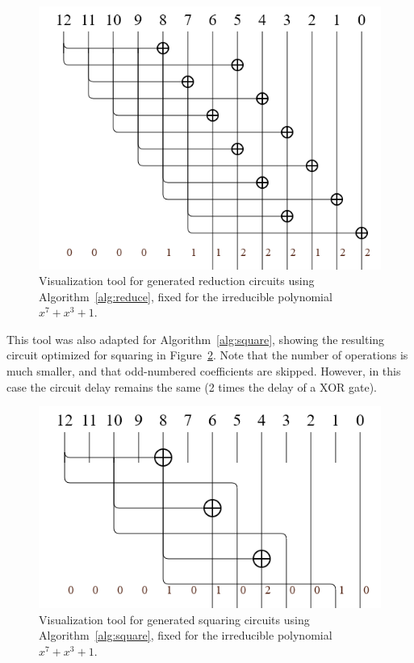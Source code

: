 \begin{figure}
  \caption{Visualization tool for generated reduction circuits using Algorithm~\ref{alg:reduce}, fixed for the irreducible polynomial $x^7 + x^3 + 1$.}
  \label{fig:circuit_reducing_7_3_0}
  \centering
  \includegraphics[width = .8\columnwidth]{figures/reducing-7-3-0.png}
\end{figure}

This tool was also adapted for Algorithm~\ref{alg:square}, showing the resulting circuit optimized for squaring in Figure~\ref{fig:circuit_squaring_7_3_0}. Note that the number of operations is much smaller, and that odd-numbered coefficients are skipped. However, in this case the circuit delay remains the same (2 times the delay of a XOR gate). \\

\begin{figure}
  \caption{Visualization tool for generated squaring circuits using Algorithm~\ref{alg:square}, fixed for the irreducible polynomial $x^7 + x^3 + 1$.}
  \label{fig:circuit_squaring_7_3_0}
  \centering
  \includegraphics[width = .8\columnwidth]{figures/squaring-7-3-0.png}
\end{figure}

